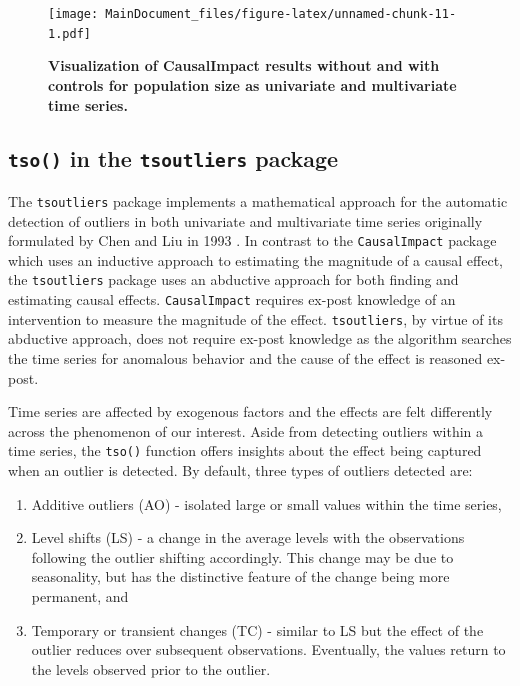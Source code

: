 \documentclass[12pt]{article}
\providecommand{\tightlist}{%
  \setlength{\itemsep}{0pt}\setlength{\parskip}{0pt}}
\begin{document}
\begin{figure}
\centering
\texttt{[image: MainDocument\_files/figure-latex/unnamed-chunk-11-1.pdf]}
\caption{\textbf{Visualization of CausalImpact results without and with controls for population size as univariate and multivariate time series.}
\label{plots}}
\end{figure}

\hypertarget{tso-in-the-tsoutliers-package}{%
\subsection{\texorpdfstring{\texttt{tso()} in the \texttt{tsoutliers}
package}{tso() in the tsoutliers package}}\label{tso-in-the-tsoutliers-package}}

The \texttt{tsoutliers} package \citep{tsoutliers} implements a
mathematical approach for the automatic detection of outliers in both
univariate and multivariate time series originally formulated by Chen
and Liu in 1993 \citep{chen1993joint}. In contrast to the
\texttt{CausalImpact} package which uses an inductive approach to
estimating the magnitude of a causal effect, the \texttt{tsoutliers}
package uses an abductive approach for both finding and estimating
causal effects. \texttt{CausalImpact} requires ex-post knowledge of an
intervention to measure the magnitude of the effect.
\texttt{tsoutliers}, by virtue of its abductive approach, does not
require ex-post knowledge as the algorithm searches the time series for
anomalous behavior and the cause of the effect is reasoned ex-post.

Time series are affected by exogenous factors and the effects are felt
differently across the phenomenon of our interest. Aside from detecting
outliers within a time series, the \texttt{tso()} function offers
insights about the effect being captured when an outlier is detected. By
default, three types of outliers detected are:

\begin{enumerate}
\def\labelenumi{\arabic{enumi}.}
\tightlist
\item
  Additive outliers (AO) - isolated large or small values within the
  time series,
\item
  Level shifts (LS) - a change in the average levels with the
  observations following the outlier shifting accordingly. This change
  may be due to seasonality, but has the distinctive feature of the
  change being more permanent, and
\item
  Temporary or transient changes (TC) - similar to LS but the effect of
  the outlier reduces over subsequent observations. Eventually, the
  values return to the levels observed prior to the outlier.
\end{enumerate}
\end{document}
